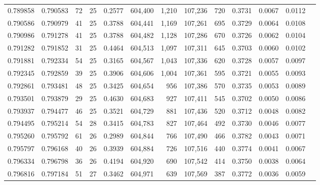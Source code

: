 \begin{tabular}{rrrrrrrrrrrrr}
0.789858 & 0.790583 &  72 &  25 &                                     0.2577 & 604,400 &   1,210 & 107,236 &     720 & 0.3731 & 0.0067 & 0.0112 \\
0.790586 & 0.790979 &  41 &  25 &                                     0.3788 & 604,441 &   1,169 & 107,261 &     695 & 0.3729 & 0.0064 & 0.0108 \\
0.790986 & 0.791278 &  41 &  25 &                                     0.3788 & 604,482 &   1,128 & 107,286 &     670 & 0.3726 & 0.0062 & 0.0104 \\
0.791282 & 0.791852 &  31 &  25 &                                     0.4464 & 604,513 &   1,097 & 107,311 &     645 & 0.3703 & 0.0060 & 0.0102 \\
0.791881 & 0.792334 &  54 &  25 &                                     0.3165 & 604,567 &   1,043 & 107,336 &     620 & 0.3728 & 0.0057 & 0.0097 \\
0.792345 & 0.792859 &  39 &  25 &                                     0.3906 & 604,606 &   1,004 & 107,361 &     595 & 0.3721 & 0.0055 & 0.0093 \\
0.792861 & 0.793481 &  48 &  25 &                                     0.3425 & 604,654 &     956 & 107,386 &     570 & 0.3735 & 0.0053 & 0.0089 \\
0.793501 & 0.793879 &  29 &  25 &                                     0.4630 & 604,683 &     927 & 107,411 &     545 & 0.3702 & 0.0050 & 0.0086 \\
0.793937 & 0.794477 &  46 &  25 &                                     0.3521 & 604,729 &     881 & 107,436 &     520 & 0.3712 & 0.0048 & 0.0082 \\
0.794495 & 0.795214 &  54 &  28 &                                     0.3415 & 604,783 &     827 & 107,464 &     492 & 0.3730 & 0.0046 & 0.0077 \\
0.795260 & 0.795792 &  61 &  26 &                                     0.2989 & 604,844 &     766 & 107,490 &     466 & 0.3782 & 0.0043 & 0.0071 \\
0.795797 & 0.796168 &  40 &  26 &                                     0.3939 & 604,884 &     726 & 107,516 &     440 & 0.3774 & 0.0041 & 0.0067 \\
0.796334 & 0.796798 &  36 &  26 &                                     0.4194 & 604,920 &     690 & 107,542 &     414 & 0.3750 & 0.0038 & 0.0064 \\
0.796816 & 0.797184 &  51 &  27 &                                     0.3462 & 604,971 &     639 & 107,569 &     387 & 0.3772 & 0.0036 & 0.0059 \\

\end{tabular}
